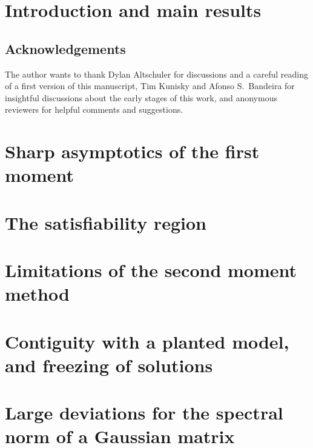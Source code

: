 \documentclass[a4paper,11pt]{article}
\newcommand{\change}[1]{{\color{red!70!black} #1}}
\begin{document}
\newpage
\setcounter{tocdepth}{2}
\tableofcontents

\newpage
\section{Introduction and main results}\label{sec:intro}


\subsection*{Acknowledgements}
\change{
The author wants to thank Dylan Altschuler for discussions and a careful reading of a first version of this manuscript, 
Tim Kunisky and Afonso S.\ Bandeira for insightful discussions about the early stages of this work, 
and anonymous reviewers for helpful comments and suggestions.
}

\section{Sharp asymptotics of the first moment}\label{sec:1st_moment}


\section{The satisfiability region}\label{sec:2nd_moment}


\section{Limitations of the second moment method}\label{sec:fail_2nd_moment}


\printbibliography

\newpage
\appendix 
{} %

\change{
\section{Contiguity with a planted model, and freezing of solutions}\label{sec:appendix_freezing}

}

\section{Large deviations for the spectral norm of a Gaussian matrix}\label{sec:appendix_ldp}

\end{document}
